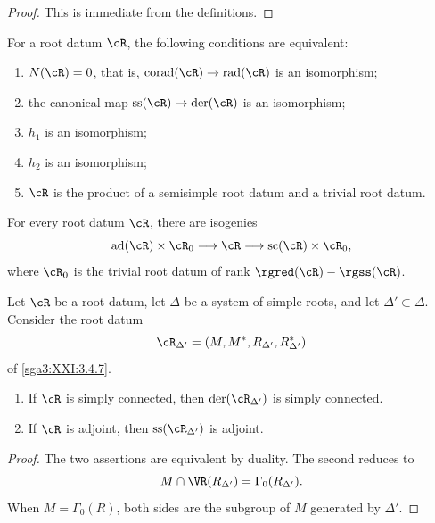 \begin{proof}
This is immediate from the definitions.
\end{proof}

\begin{corollary}\label{sga3:XXI:6.5.9}
For a root datum \(\cR\), the following conditions are equivalent:
\begin{enumerate}
\item[(i)] \(N(\cR)=0\), that is,
  \(\operatorname{corad}(\cR)\to\operatorname{rad}(\cR)\) is an
  isomorphism;
\item[(ii)] the canonical map
  \(\operatorname{ss}(\cR)\to\operatorname{der}(\cR)\) is an
  isomorphism;
\item[(iii)] \(h_1\) is an isomorphism;
\item[(iv)] \(h_2\) is an isomorphism;
\item[(v)] \(\cR\) is the product of a semisimple root datum and a
  trivial root datum.
\end{enumerate}
\end{corollary}

\begin{corollary}\label{sga3:XXI:6.5.10}
For every root datum \(\cR\), there are isogenies
\[
 \operatorname{ad}(\cR)\times\cR_0
 \longrightarrow\cR\longrightarrow
 \operatorname{sc}(\cR)\times\cR_0,
\]
where \(\cR_0\) is the trivial root datum of rank
\(\rgred(\cR)-\rgss(\cR)\).
\end{corollary}

\begin{lemma}\label{sga3:XXI:6.5.11}
Let \(\cR\) be a root datum, let \(\Delta\) be a system of simple
roots, and let \(\Delta'\subset\Delta\). Consider the root datum
\[
 \cR_{\Delta'}=(M,M^\ast,R_{\Delta'},R^\ast_{\Delta'})
\]
of \ref{sga3:XXI:3.4.7}.
\begin{enumerate}
\item[(i)] If \(\cR\) is simply connected, then
  \(\operatorname{der}(\cR_{\Delta'})\) is simply connected.
\item[(ii)] If \(\cR\) is adjoint, then
  \(\operatorname{ss}(\cR_{\Delta'})\) is adjoint.
\end{enumerate}
\end{lemma}

\begin{proof}
The two assertions are equivalent by duality. The second reduces to
\[
 M\cap\VR(R_{\Delta'})=\Gamma_0(R_{\Delta'}).
\]
When \(M=\Gamma_0(R)\), both sides are the subgroup of \(M\) generated
by \(\Delta'\).
\end{proof}

